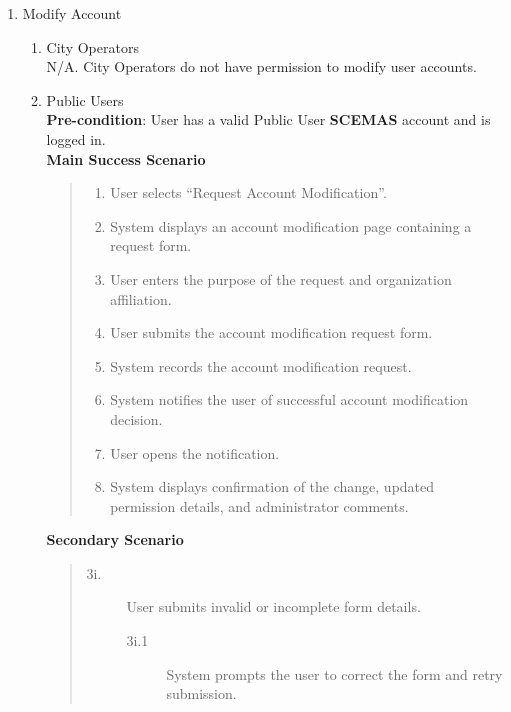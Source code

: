 \documentclass[]{article}
\begin{document}
\begin{enumerate}[{\bf BE8.}]
	\item Modify Account
		\begin{enumerate}[{\bf VP1.}]
			\item City Operators \\
				    N/A. City Operators do not have permission to modify user accounts.

			\item Public Users \\
                \textbf{Pre-condition}: User has a valid Public User \textbf{SCEMAS} account and is logged in. \\
                \textbf{Main Success Scenario}
                \begin{quote}
                    \begin{enumerate}[1.]
                        \item User selects ``Request Account Modification''.
                        \item System displays an account modification page containing a request form.
                        \item User enters the purpose of the request and organization affiliation.
                        \item User submits the account modification request form.
                        \item System records the account modification request.
                        \item System notifies the user of successful account modification decision.
                        \item User opens the notification.
                        \item System displays confirmation of the change, updated permission details, and administrator comments.
                    \end{enumerate}
                \end{quote}
                \textbf{Secondary Scenario}
                \begin{quote}
                    \begin{description}
                        \item[\textmd{3i.}] User submits invalid or incomplete form details.
                        \begin{description}
                            \item[\textmd{3i.1}] System prompts the user to correct the form and retry submission.

\end{description}
\end{description}
\end{quote}
\end{enumerate}
\end{enumerate}
\end{document}
